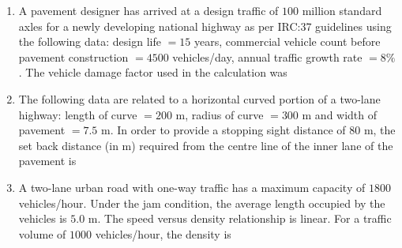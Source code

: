 \documentclass[journal]{IEEEtran}
\begin{document}
\begin{enumerate}
\item A pavement designer has arrived at a design traffic of $100$ million standard axles for a newly developing national highway as per IRC:37 guidelines using the following data: design life $=15$ years, commercial vehicle count before pavement construction $=4500$ vehicles/day, annual traffic growth rate $=8\%$. The vehicle damage factor used in the calculation was \hfill {}
\begin{enumerate}
\end{enumerate}

\item The following data are related to a horizontal curved portion of a two-lane highway: length of curve $=200$ m, radius of curve $=300$ m and width of pavement $=7.5$ m. In order to provide a stopping sight distance  of $80$ m, the set back distance (in m) required from the centre line of the inner lane of the pavement is \hfill {}
\begin{enumerate}
\end{enumerate}

\item A two-lane urban road with one-way traffic has a maximum capacity of $1800$ vehicles/hour. Under the jam condition, the average length occupied by the vehicles is $5.0$ m. The speed versus density relationship is linear. For a traffic volume of $1000$ vehicles/hour, the density  is \hfill {}
\begin{enumerate}
\end{enumerate}


\end{enumerate}
\end{document}

